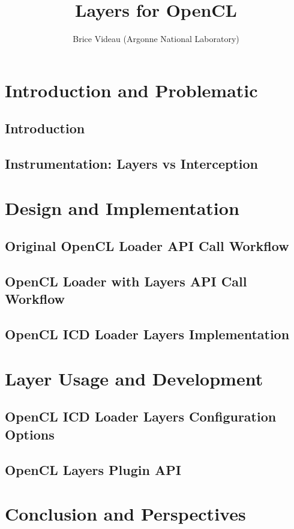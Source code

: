 \documentclass{beamer}
\title{Layers for OpenCL}
\author{Brice Videau (Argonne National Laboratory)}
\begin{document}
\frame{\titlepage}

\section{Introduction and Problematic}

\subsection{Introduction}


\subsection[Instrumentation]{Instrumentation: Layers vs Interception}


\section{Design and Implementation}

\subsection[API Call]{Original OpenCL Loader API Call Workflow}


\subsection[Layer API Call]{OpenCL Loader with Layers API Call Workflow}


\subsection[Implementation]{OpenCL ICD Loader Layers Implementation}


\section{Layer Usage and Development}
\subsection[configuration]{OpenCL ICD Loader Layers Configuration Options}


\subsection[Layer API]{OpenCL Layers Plugin API}


\section[Conclusion]{Conclusion and Perspectives}

\end{document}
